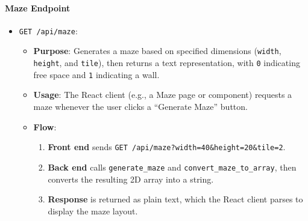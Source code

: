 \documentclass[12pt,a4paper]{article}
\begin{document}
\paragraph{Maze Endpoint}
\begin{itemize}
  \item \texttt{GET /api/maze}:
    \begin{itemize}
      \item \textbf{Purpose}: Generates a maze based on specified dimensions (\texttt{width}, \texttt{height}, and \texttt{tile}), then returns a text representation, with \texttt{0} indicating free space and \texttt{1} indicating a wall.
      \item \textbf{Usage}: The React client (e.g., a Maze page or component) requests a maze whenever the user clicks a “Generate Maze” button.
      \item \textbf{Flow}:
        \begin{enumerate}
          \item \textbf{Front end} sends \texttt{GET /api/maze?width=40\&height=20\&tile=2}.
          \item \textbf{Back end} calls \texttt{generate\_maze} and \texttt{convert\_maze\_to\_array}, then converts the resulting 2D array into a string.
          \item \textbf{Response} is returned as plain text, which the React client parses to display the maze layout.
        \end{enumerate}
    \end{itemize}
\end{itemize}
\end{document}
